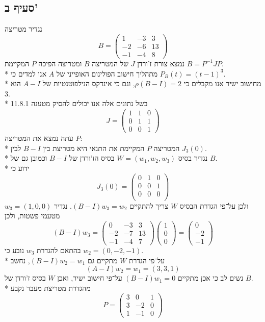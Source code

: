 \subsection{סעיף ב'}
נגדיר מטריצה
\[
	B = \begin{pmatrix}
		1 & -3 & 3 \\
		-2 & -6 & 13 \\
		-1 & -4 & 8
	\end{pmatrix}
\]
נמצא צורת ז'ורדן $J$ של המטריצה $B$ ומטריצה הפיכה $P$ המקיימת $B = P^{-1} J P$. \\*
מתהליך חישוב הפולינום האופייני של $A$ אנו למדים כי $P_B(t) = {(t - 1)}^3$. \\*
מחישוב ישיר אנו מקבלים כי $\rho(B - I) = 2$, וגם כי אינדקס הנילפוטנטיות של $A - I$ הוא $3$. \\*
בשל נתונים אלה אנו יכולים להסיק מטענה 11.8.1
\[
	J = \begin{pmatrix}
		1 & 1 & 0 \\
		0 & 1 & 1 \\
		0 & 0 & 1
	\end{pmatrix}
\]
עתה נמצא את המטריצה $P$: \\*
המטריצה $P$ המקיימת את התנאי היא מטריצת בין $B - I$ לבין $J_3(0)$. \\*
נגדיר בסיס $W = (w_1, w_2, w_3)$ בסיס הז'ורדן של $B - I$ וכמובן גם של $B$. \\*
ידוע כי
\[
	J_3(0) = \begin{pmatrix}
		0 & 1 & 0 \\
		0 & 0 & 1 \\
		0 & 0 & 0 \\
	\end{pmatrix}
\]
ולכן על־פי הגדרת הבסיס $W$ צריך להתקיים $(B - I) w_3 = w_2$.
נגדיר $w_3 = (1, 0, 0)$ מטעמי פשטות, ולכן
\[
	(B - I) w_3
	= \begin{pmatrix}
		0 & -3 & 3 \\
		-2 & -7 & 13 \\
		-1 & -4 & 7
	\end{pmatrix}
	\begin{pmatrix}
		1 \\ 0 \\ 0
	\end{pmatrix}
	= \begin{pmatrix}
		0 \\
		-2 \\
		-1
	\end{pmatrix}
\]
בהתאם להגדרת $w_3$ נובע כי $w_2 = (0, -2, -1)$. \\*
על־פי הגדרת $W$ מתקיים גם $(B - I) w_2 = w_1$, נחשב
\[
	(A - I) w_2 = w_1 = (3, 3, 1)
\]
נשים לב כי אכן מתקיים $(B - I) w_1 = 0$ על־פי חישוב ישיר, ואכן $W$ בסיס ז'ורדן של $B$. \\*
מהגדרת מטריצת מעבר נקבע
\[
	P = \begin{pmatrix}
		3 & 0 & 1 \\
		3 & -2 & 0 \\
		1 & -1 & 0
	\end{pmatrix}
\]

